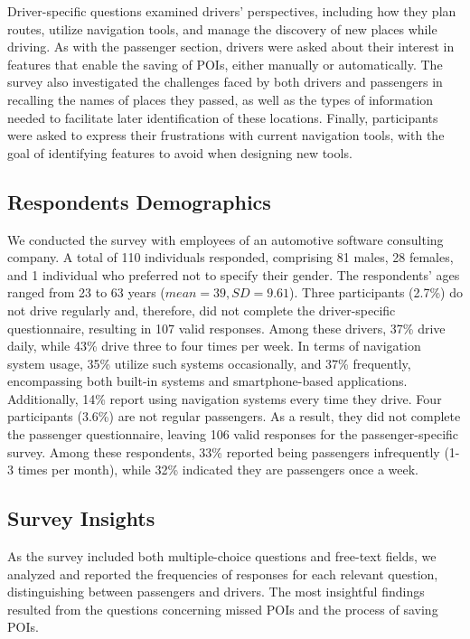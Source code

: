 Driver-specific questions examined drivers' perspectives, including how they plan routes, utilize navigation tools, and manage the discovery of new places while driving. As with the passenger section, drivers were asked about their interest in features that enable the saving of POIs, either manually or automatically. The survey also investigated the challenges faced by both drivers and passengers in recalling the names of places they passed, as well as the types of information needed to facilitate later identification of these locations. Finally, participants were asked to express their frustrations with current navigation tools, with the goal of identifying features to avoid when designing new tools.



\subsection{Respondents Demographics}
We conducted the survey with employees of an automotive software consulting company. A total of 110 individuals responded, comprising 81 males, 28 females, and 1 individual who preferred not to specify their gender. The respondents' ages ranged from 23 to 63 years ($mean = 39, SD = 9.61$). Three participants (2.7\%) do not drive regularly and, therefore, did not complete the driver-specific questionnaire, resulting in 107 valid responses. Among these drivers, 37\% drive daily, while 43\% drive three to four times per week. In terms of navigation system usage, 35\% utilize such systems occasionally, and 37\% frequently, encompassing both built-in systems and smartphone-based applications. Additionally, 14\% report using navigation systems every time they drive. Four participants (3.6\%) are not regular passengers. As a result, they did not complete the passenger questionnaire, leaving 106 valid responses for the passenger-specific survey. Among these respondents, 33\% reported being passengers infrequently (1-3 times per month), while 32\% indicated they are passengers once a week. 



\subsection{Survey Insights}
\label{surveyResults}
As the survey included both multiple-choice questions and free-text fields, we analyzed and reported the frequencies of responses for each relevant question, distinguishing between passengers and drivers. The most insightful findings resulted from the questions concerning missed POIs and the process of saving POIs.

